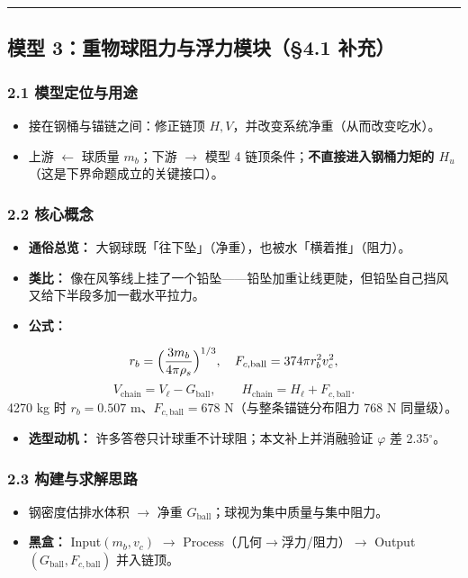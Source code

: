 \documentclass[UTF8,a4paper,zihao=-4]{ctexart}
\begin{document}
\vspace{0.4em}\hrule\vspace{0.4em}

\subsection{\texorpdfstring{模型 3：重物球阻力与浮力模块（§4.1 补充）}{模型 3：重物球阻力与浮力模块（§4.1 补充）}}

\subsubsection{\texorpdfstring{2.1 模型定位与用途}{2.1 模型定位与用途}}
\begin{itemize}[leftmargin=1.5em]
\item 接在钢桶与锚链之间：修正链顶 \(H,V\)，并改变系统净重（从而改变吃水）。
\item 上游 $\leftarrow$ 球质量 \(m_b\)；下游 $\rightarrow$ 模型 4 链顶条件；\textbf{不直接进入钢桶力矩的 \(H_u\)}（这是下界命题成立的关键接口）。
\end{itemize}

\subsubsection{\texorpdfstring{2.2 核心概念}{2.2 核心概念}}
\begin{itemize}[leftmargin=1.5em]
\item \textbf{通俗总览：} 大钢球既「往下坠」（净重），也被水「横着推」（阻力）。
\item \textbf{类比：} 像在风筝线上挂了一个铅坠------铅坠加重让线更陡，但铅坠自己挡风又给下半段多加一截水平拉力。
\item \textbf{公式：}
\end{itemize}
  \[
  r_b=\Bigl(\frac{3m_b}{4\pi\rho_s}\Bigr)^{1/3},\quad
  F_{c,\mathrm{ball}}=374\pi r_b^2 v_c^2,
  \]
  \[
  V_{\mathrm{chain}}=V_\ell-G_{\mathrm{ball}},\qquad
  H_{\mathrm{chain}}=H_\ell+F_{c,\mathrm{ball}}.
  \]
  4270 kg 时 \(r_b=0.507\) m、\(F_{c,\mathrm{ball}}=678\) N（与整条锚链分布阻力 768 N 同量级）。
\begin{itemize}[leftmargin=1.5em]
\item \textbf{选型动机：} 许多答卷只计球重不计球阻；本文补上并消融验证 \(\varphi\) 差 2.35$^\circ$。
\end{itemize}

\subsubsection{\texorpdfstring{2.3 构建与求解思路}{2.3 构建与求解思路}}
\begin{itemize}[leftmargin=1.5em]
\item 钢密度估排水体积 $\rightarrow$ 净重 \(G_{\mathrm{ball}}\)；球视为集中质量与集中阻力。
\item \textbf{黑盒：} Input\((m_b,v_c)\) $\rightarrow$ Process（几何$\rightarrow$浮力/阻力）$\rightarrow$ Output\((G_{\mathrm{ball}},F_{c,\mathrm{ball}})\) 并入链顶。
\end{itemize}
\end{document}
